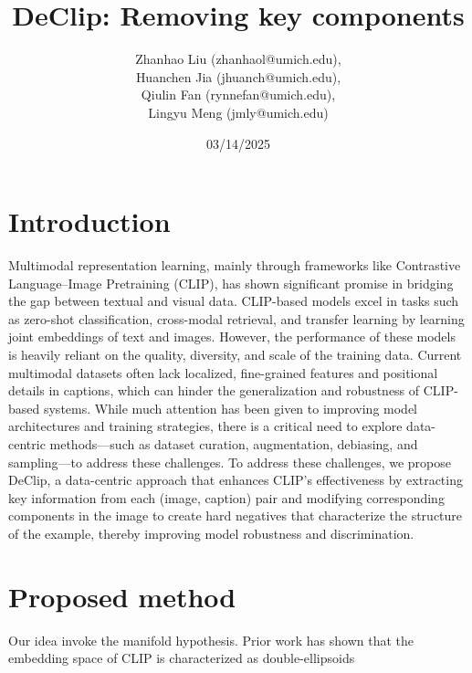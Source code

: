 \documentclass[11pt,letterpaper]{article}
\begin{document}
\title{DeClip: Removing key components }


\author{
Zhanhao Liu (zhanhaol@umich.edu), \\
Huanchen Jia (jhuanch@umich.edu),\\
Qiulin Fan (rynnefan@umich.edu),\\
Lingyu Meng (jmly@umich.edu)\\
}

\date{03/14/2025}


\maketitle


\section{Introduction}
Multimodal representation learning, mainly through frameworks like Contrastive Language–Image Pretraining (CLIP), has shown significant promise in bridging the gap between textual and visual data. CLIP-based models excel in tasks such as zero-shot classification, cross-modal retrieval, and transfer learning by learning joint embeddings of text and images. However, the performance of these models is heavily reliant on the quality, diversity, and scale of the training data. Current multimodal datasets often lack localized, fine-grained features and positional details in captions, which can hinder the generalization and robustness of CLIP-based systems. While much attention has been given to improving model architectures and training strategies, there is a critical need to explore data-centric methods—such as dataset curation, augmentation, debiasing, and sampling—to address these challenges. To address these challenges, we propose DeClip, a data-centric approach that enhances CLIP’s effectiveness by extracting key information from each (image, caption) pair and modifying corresponding components in the image to create hard negatives that characterize the structure of the example, thereby improving model robustness and discrimination.



\section{Proposed method}
Our idea invoke the manifold hypothesis. Prior work has shown that the embedding space of CLIP is characterized as double-ellipsoids
\end{document}
